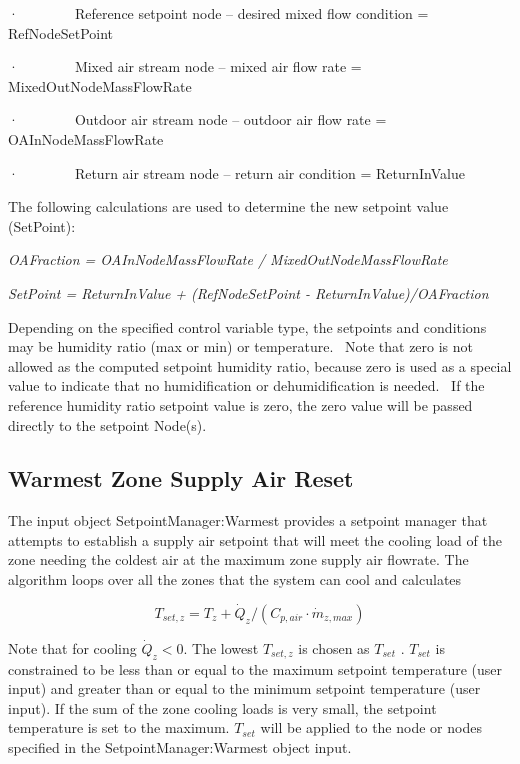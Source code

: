 ·~~~~~~~~Reference setpoint node -- desired mixed flow condition = RefNodeSetPoint

·~~~~~~~~Mixed air stream node -- mixed air flow rate = MixedOutNodeMassFlowRate

·~~~~~~~~Outdoor air stream node -- outdoor air flow rate = OAInNodeMassFlowRate

·~~~~~~~~Return air stream node -- return air condition = ReturnInValue

The following calculations are used to determine the new setpoint value (SetPoint):

\emph{OAFraction = OAInNodeMassFlowRate / MixedOutNodeMassFlowRate}

\emph{SetPoint = ReturnInValue + (RefNodeSetPoint - ReturnInValue)/OAFraction}

Depending on the specified control variable type, the setpoints and conditions may be humidity ratio (max or min) or temperature.~ Note that zero is not allowed as the computed setpoint humidity ratio, because zero is used as a special value to indicate that no humidification or dehumidification is needed.~ If the reference humidity ratio setpoint value is zero, the zero value will be passed directly to the setpoint Node(s).

\subsection{Warmest Zone Supply Air Reset}\label{warmest-zone-supply-air-reset}

The input object SetpointManager:Warmest provides a setpoint manager that attempts to establish a supply air setpoint that will meet the cooling load of the zone needing the coldest air at the maximum zone supply air flowrate. The algorithm loops over all the zones that the system can cool and calculates

\begin{equation}
{T_{set,z}} = {T_z} + {\dot Q_z}/({C_{p,air}}\cdot {\dot m_{z,max}})
\end{equation}

Note that for cooling \({\dot Q_z} < 0.\) The lowest \({T_{set,z}}\) is chosen as \({T_{set}}\) . \({T_{set}}\) is constrained to be less than or equal to the maximum setpoint temperature (user input) and greater than or equal to the minimum setpoint temperature (user input). If the sum of the zone cooling loads is very small, the setpoint temperature is set to the maximum. \({T_{set}}\) will be applied to the node or nodes specified in the SetpointManager:Warmest object input.

